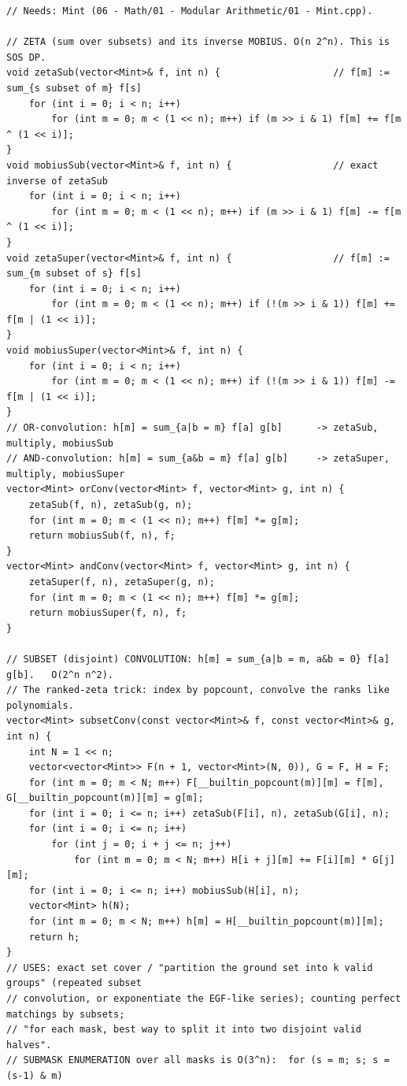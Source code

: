 \documentclass[9pt,a4paper,twocolumn]{extarticle}
\begin{document}
\begin{lstlisting}
// Needs: Mint (06 - Math/01 - Modular Arithmetic/01 - Mint.cpp).

// ZETA (sum over subsets) and its inverse MOBIUS. O(n 2^n). This is SOS DP.
void zetaSub(vector<Mint>& f, int n) {                    // f[m] := sum_{s subset of m} f[s]
    for (int i = 0; i < n; i++)
        for (int m = 0; m < (1 << n); m++) if (m >> i & 1) f[m] += f[m ^ (1 << i)];
}
void mobiusSub(vector<Mint>& f, int n) {                  // exact inverse of zetaSub
    for (int i = 0; i < n; i++)
        for (int m = 0; m < (1 << n); m++) if (m >> i & 1) f[m] -= f[m ^ (1 << i)];
}
void zetaSuper(vector<Mint>& f, int n) {                  // f[m] := sum_{m subset of s} f[s]
    for (int i = 0; i < n; i++)
        for (int m = 0; m < (1 << n); m++) if (!(m >> i & 1)) f[m] += f[m | (1 << i)];
}
void mobiusSuper(vector<Mint>& f, int n) {
    for (int i = 0; i < n; i++)
        for (int m = 0; m < (1 << n); m++) if (!(m >> i & 1)) f[m] -= f[m | (1 << i)];
}
// OR-convolution: h[m] = sum_{a|b = m} f[a] g[b]      -> zetaSub, multiply, mobiusSub
// AND-convolution: h[m] = sum_{a&b = m} f[a] g[b]     -> zetaSuper, multiply, mobiusSuper
vector<Mint> orConv(vector<Mint> f, vector<Mint> g, int n) {
    zetaSub(f, n), zetaSub(g, n);
    for (int m = 0; m < (1 << n); m++) f[m] *= g[m];
    return mobiusSub(f, n), f;
}
vector<Mint> andConv(vector<Mint> f, vector<Mint> g, int n) {
    zetaSuper(f, n), zetaSuper(g, n);
    for (int m = 0; m < (1 << n); m++) f[m] *= g[m];
    return mobiusSuper(f, n), f;
}

// SUBSET (disjoint) CONVOLUTION: h[m] = sum_{a|b = m, a&b = 0} f[a] g[b].   O(2^n n^2).
// The ranked-zeta trick: index by popcount, convolve the ranks like polynomials.
vector<Mint> subsetConv(const vector<Mint>& f, const vector<Mint>& g, int n) {
    int N = 1 << n;
    vector<vector<Mint>> F(n + 1, vector<Mint>(N, 0)), G = F, H = F;
    for (int m = 0; m < N; m++) F[__builtin_popcount(m)][m] = f[m], G[__builtin_popcount(m)][m] = g[m];
    for (int i = 0; i <= n; i++) zetaSub(F[i], n), zetaSub(G[i], n);
    for (int i = 0; i <= n; i++)
        for (int j = 0; i + j <= n; j++)
            for (int m = 0; m < N; m++) H[i + j][m] += F[i][m] * G[j][m];
    for (int i = 0; i <= n; i++) mobiusSub(H[i], n);
    vector<Mint> h(N);
    for (int m = 0; m < N; m++) h[m] = H[__builtin_popcount(m)][m];
    return h;
}
// USES: exact set cover / "partition the ground set into k valid groups" (repeated subset
// convolution, or exponentiate the EGF-like series); counting perfect matchings by subsets;
// "for each mask, best way to split it into two disjoint valid halves".
// SUBMASK ENUMERATION over all masks is O(3^n):  for (s = m; s; s = (s-1) & m)
\end{lstlisting}
\end{document}
